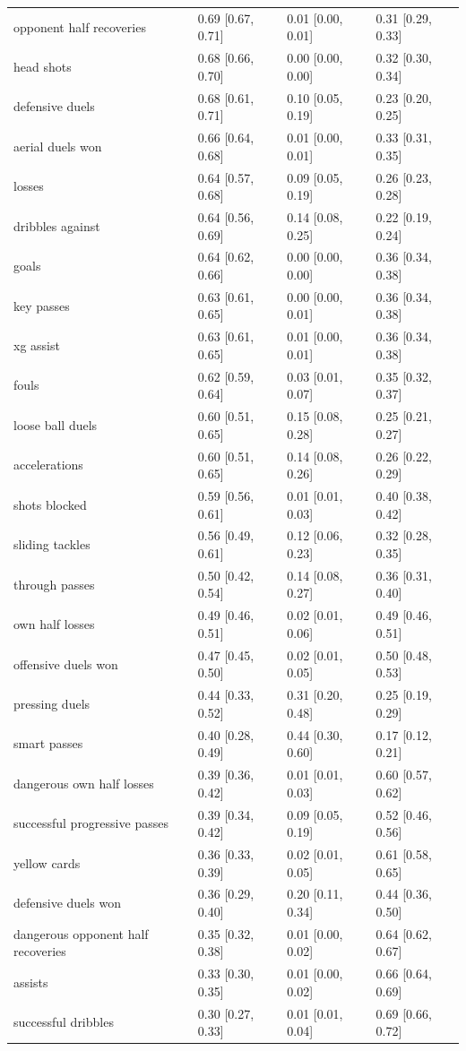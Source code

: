 \begin{longtable}{llll}
opponent half recoveries & 0.69 [0.67, 0.71] & 0.01 [0.00, 0.01] & 0.31 [0.29, 0.33]\\
head shots & 0.68 [0.66, 0.70] & 0.00 [0.00, 0.00] & 0.32 [0.30, 0.34]\\
defensive duels & 0.68 [0.61, 0.71] & 0.10 [0.05, 0.19] & 0.23 [0.20, 0.25]\\
aerial duels won & 0.66 [0.64, 0.68] & 0.01 [0.00, 0.01] & 0.33 [0.31, 0.35]\\
losses & 0.64 [0.57, 0.68] & 0.09 [0.05, 0.19] & 0.26 [0.23, 0.28]\\
dribbles against & 0.64 [0.56, 0.69] & 0.14 [0.08, 0.25] & 0.22 [0.19, 0.24]\\
goals & 0.64 [0.62, 0.66] & 0.00 [0.00, 0.00] & 0.36 [0.34, 0.38]\\
key passes & 0.63 [0.61, 0.65] & 0.00 [0.00, 0.01] & 0.36 [0.34, 0.38]\\
xg assist & 0.63 [0.61, 0.65] & 0.01 [0.00, 0.01] & 0.36 [0.34, 0.38]\\
fouls & 0.62 [0.59, 0.64] & 0.03 [0.01, 0.07] & 0.35 [0.32, 0.37]\\
loose ball duels & 0.60 [0.51, 0.65] & 0.15 [0.08, 0.28] & 0.25 [0.21, 0.27]\\
accelerations & 0.60 [0.51, 0.65] & 0.14 [0.08, 0.26] & 0.26 [0.22, 0.29]\\
shots blocked & 0.59 [0.56, 0.61] & 0.01 [0.01, 0.03] & 0.40 [0.38, 0.42]\\
sliding tackles & 0.56 [0.49, 0.61] & 0.12 [0.06, 0.23] & 0.32 [0.28, 0.35]\\
through passes & 0.50 [0.42, 0.54] & 0.14 [0.08, 0.27] & 0.36 [0.31, 0.40]\\
own half losses & 0.49 [0.46, 0.51] & 0.02 [0.01, 0.06] & 0.49 [0.46, 0.51]\\
offensive duels won & 0.47 [0.45, 0.50] & 0.02 [0.01, 0.05] & 0.50 [0.48, 0.53]\\
pressing duels & 0.44 [0.33, 0.52] & 0.31 [0.20, 0.48] & 0.25 [0.19, 0.29]\\
smart passes & 0.40 [0.28, 0.49] & 0.44 [0.30, 0.60] & 0.17 [0.12, 0.21]\\
dangerous own half losses & 0.39 [0.36, 0.42] & 0.01 [0.01, 0.03] & 0.60 [0.57, 0.62]\\
successful progressive passes & 0.39 [0.34, 0.42] & 0.09 [0.05, 0.19] & 0.52 [0.46, 0.56]\\
yellow cards & 0.36 [0.33, 0.39] & 0.02 [0.01, 0.05] & 0.61 [0.58, 0.65]\\
defensive duels won & 0.36 [0.29, 0.40] & 0.20 [0.11, 0.34] & 0.44 [0.36, 0.50]\\
dangerous opponent half recoveries & 0.35 [0.32, 0.38] & 0.01 [0.00, 0.02] & 0.64 [0.62, 0.67]\\
assists & 0.33 [0.30, 0.35] & 0.01 [0.00, 0.02] & 0.66 [0.64, 0.69]\\
successful dribbles & 0.30 [0.27, 0.33] & 0.01 [0.01, 0.04] & 0.69 [0.66, 0.72]\\
\bottomrule
\end{longtable}
